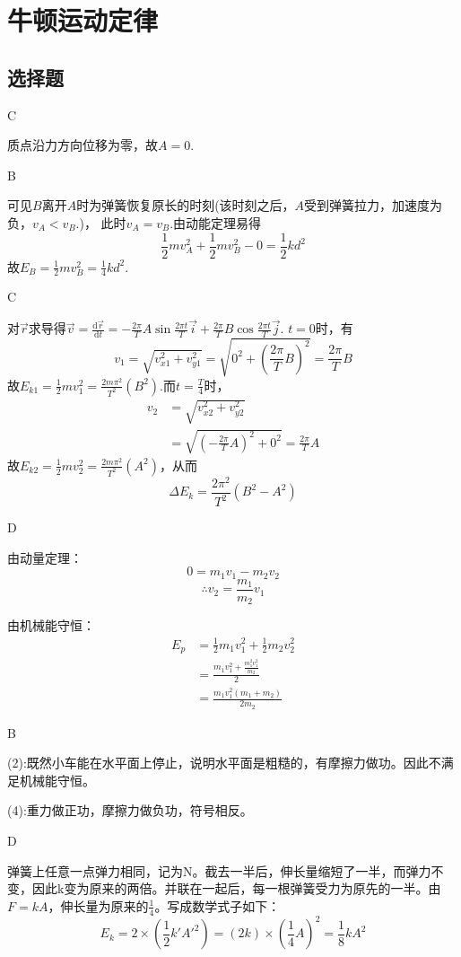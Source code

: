 \documentclass[b5paper,opensource,sourcefont,parskip]{qyxf-book}
\newcommand{\di}[1]{\mathrm{d}#1}
\begin{document}
\chapter{牛顿运动定律}
\section{选择题}

C

\solve 质点沿力方向位移为零，故$A=0$.

B

\solve 可见$B$离开$A$时为弹簧恢复原长的时刻(该时刻之后，$A$受到弹簧拉力，加速度为负，$v_A<v_B$.)，
此时$v_A=v_B$.由动能定理易得
\[\frac{1}{2}mv_A^2+\frac{1}{2}mv_B^2-0=\frac{1}{2}kd^2\]
故$E_B=\frac{1}{2}mv_B^2=\frac{1}{4}kd^2$.


C

\solve 对$\vec{r}$求导得$\vec{v}=\frac{\di{\vec{r}}}{\di{t}}=-\frac{2\pi}{T}A\sin\frac{2\pi t}{T}\vec{i}+\frac{2\pi}{T}B\cos\frac{2\pi t}{T}\vec{j}$.
$t=0$时，有
\[
v_1=\sqrt{v_{x1}^2+v_{y1}^2}=\sqrt{0^2+\left(\frac{2\pi}{T}B\right)^2}=\frac{2\pi}{T}B
\]
故$E_{k1}=\frac{1}{2}mv_1^2=\frac{2m\pi^2}{T^2}\left(B^2\right)$.而$t=\frac{T}{4}$时，
\begin{align*}
v_2&=\sqrt{v_{x2}^2+v_{y2}^2}\\
&=\sqrt{\left(-\frac{2\pi}{T}A\right)^2+0^2}=\frac{2\pi}{T}A
\end{align*}
故$E_{k2}=\frac{1}{2}mv_2^2=\frac{2m\pi^2}{T^2}\left(A^2\right)$，从而
\[\Delta{}E_k=\frac{2\pi^2}{T^2}(B^2-A^2)\]


D

\solve 由动量定理：
\[0=m_1v_1-m_2v_2\]
\[\therefore{}v_2=\frac{m_1}{m_2}v_1\]

由机械能守恒：
\begin{align*}
E_p &=\frac{1}{2}m_1v_1^2+\frac{1}{2}m_2v_2^2\\
&=\frac{m_1v_1^2+\frac{m_1^2v_1^2}{m_2}}{2}\\
&=\frac{m_1v_1^2\left(m_1+m_2\right)}{2m_2}
\end{align*}

B

\solve (2):既然小车能在水平面上停止，说明水平面是粗糙的，有摩擦力做功。因此不满足机械能守恒。

(4):重力做正功，摩擦力做负功，符号相反。

D

\solve 弹簧上任意一点弹力相同，记为N。截去一半后，伸长量缩短了一半，而弹力不变，因此k变为原来的两倍。并联在一起后，每一根弹簧受力为原先的一半。由$F=kA$，伸长量为原来的$\frac{1}{4}$。写成数学式子如下：
\[
E_k=2\times\left(\frac{1}{2}k'A'^2\right)=\left(2k\right)\times\left(\frac{1}{4}A\right)^2=\frac{1}{8}kA^2
\]
\end{document}
